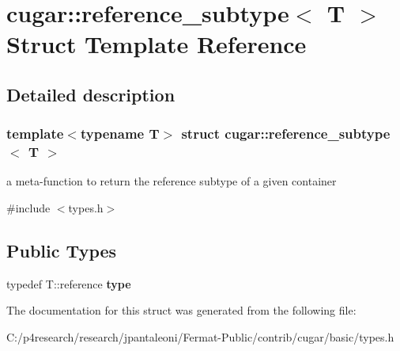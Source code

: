 \hypertarget{structcugar_1_1reference__subtype}{}\section{cugar\+:\+:reference\+\_\+subtype$<$ T $>$ Struct Template Reference}
\label{structcugar_1_1reference__subtype}


\subsection{Detailed description}
\subsubsection*{template$<$typename T$>$\newline
struct cugar\+::reference\+\_\+subtype$<$ T $>$}

a meta-\/function to return the reference subtype of a given container 

{\ttfamily \#include $<$types.\+h$>$}

\subsection*{Public Types}
\begin{DoxyCompactItemize}
\item 
\mbox{\label{structcugar_1_1reference__subtype_aa9e90fa5a6624603aa33bc00414f5aa7}} 
typedef T\+::reference {\bfseries type}
\end{DoxyCompactItemize}


The documentation for this struct was generated from the following file\+:\begin{DoxyCompactItemize}
\item 
C\+:/p4research/research/jpantaleoni/\+Fermat-\/\+Public/contrib/cugar/basic/types.\+h\end{DoxyCompactItemize}
